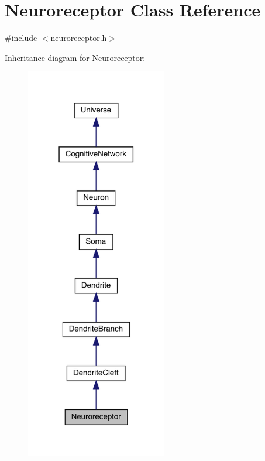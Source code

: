 \hypertarget{class_neuroreceptor}{}\section{Neuroreceptor Class Reference}
\label{class_neuroreceptor}


{\ttfamily \#include $<$neuroreceptor.\+h$>$}



Inheritance diagram for Neuroreceptor\+:\nopagebreak
\begin{figure}[H]
\begin{center}
\leavevmode
\includegraphics[width=175pt]{class_neuroreceptor__inherit__graph}
\end{center}
\end{figure}


